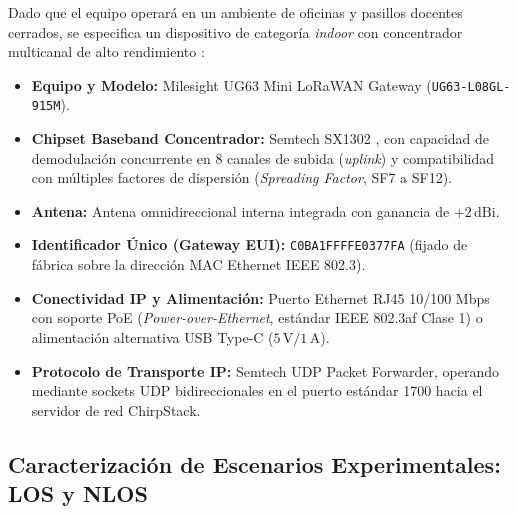 \documentclass[12pt,oneside,openany,spanish,oldfontcommands]{memoir}
\begin{document}
Dado que el equipo operará en un ambiente de oficinas y pasillos docentes cerrados, se
especifica un dispositivo de categoría \textit{indoor} con concentrador multicanal de alto
rendimiento \parencite{milesight_ug63}:
\begin{itemize}
    \item \textbf{Equipo y Modelo:} Milesight UG63 Mini LoRaWAN Gateway (\texttt{UG63-L08GL-915M}).
    \item \textbf{Chipset Baseband Concentrador:} Semtech SX1302 \parencite{semtech_sx1302}, con capacidad
    de demodulación concurrente en 8 canales de subida (\textit{uplink}) y compatibilidad con
    múltiples factores de dispersión (\textit{Spreading Factor}, SF7 a SF12).
    \item \textbf{Antena:} Antena omnidireccional interna integrada con ganancia de $+2\,\text{dBi}$.
    \item \textbf{Identificador Único (Gateway EUI):} \texttt{C0BA1FFFFE0377FA} (fijado de fábrica
    sobre la dirección MAC Ethernet IEEE 802.3).
    \item \textbf{Conectividad IP y Alimentación:} Puerto Ethernet RJ45 10/100 Mbps con soporte
    PoE (\textit{Power-over-Ethernet}, estándar IEEE 802.3af Clase 1) o alimentación alternativa
    USB Type-C ($5\,\text{V} / 1\,\text{A}$).
    \item \textbf{Protocolo de Transporte IP:} Semtech UDP Packet Forwarder, operando mediante
    sockets UDP bidireccionales en el puerto estándar 1700 hacia el servidor de red ChirpStack.
\end{itemize}

\subsection{Caracterización de Escenarios Experimentales: LOS y NLOS}
\end{document}
